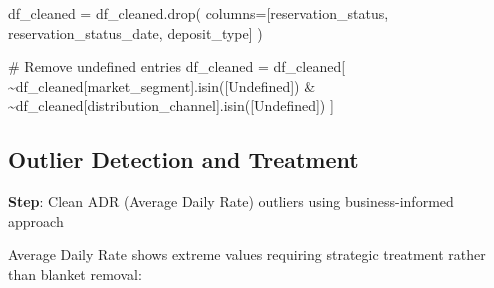 \documentclass[
  letterpaper,
  DIV=11,
  numbers=noendperiod]{scrartcl}
\newenvironment{Shaded}{\begin{snugshade}}{\end{snugshade}}
\newcommand{\CommentTok}[1]{\textcolor[rgb]{0.37,0.37,0.37}{#1}}
\newcommand{\NormalTok}[1]{\textcolor[rgb]{0.00,0.23,0.31}{#1}}
\newcommand{\OperatorTok}[1]{\textcolor[rgb]{0.37,0.37,0.37}{#1}}
\newcommand{\StringTok}[1]{\textcolor[rgb]{0.13,0.47,0.30}{#1}}
\renewenvironment{Shaded}{%
  \begin{tcolorbox}[%
    enhanced,%
    colback=codebg,%
    colframe=codebg,%
    borderline west={3pt}{0pt}{sectionblue},%
    fontupper=\small\ttfamily,%
    boxrule=0pt,%
    arc=0pt,%
    boxsep=5pt,%
    left=2mm,%
    right=2mm,%
    top=2mm,%
    bottom=2mm%
  ]%
}{%
  \end{tcolorbox}%
}
\begin{document}
\begin{Shaded}
\begin{Highlighting}[]
\NormalTok{df\_cleaned }\OperatorTok{=}\NormalTok{ df\_cleaned.drop(}
\NormalTok{    columns}\OperatorTok{=}\NormalTok{[}\StringTok{\textquotesingle{}reservation\_status\textquotesingle{}}\NormalTok{, }\StringTok{\textquotesingle{}reservation\_status\_date\textquotesingle{}}\NormalTok{, }\StringTok{\textquotesingle{}deposit\_type\textquotesingle{}}\NormalTok{]}
\NormalTok{)}

\CommentTok{\# Remove undefined entries}
\NormalTok{df\_cleaned }\OperatorTok{=}\NormalTok{ df\_cleaned[}
    \OperatorTok{\textasciitilde{}}\NormalTok{df\_cleaned[}\StringTok{\textquotesingle{}market\_segment\textquotesingle{}}\NormalTok{].isin([}\StringTok{\textquotesingle{}Undefined\textquotesingle{}}\NormalTok{]) }\OperatorTok{\&} 
    \OperatorTok{\textasciitilde{}}\NormalTok{df\_cleaned[}\StringTok{\textquotesingle{}distribution\_channel\textquotesingle{}}\NormalTok{].isin([}\StringTok{\textquotesingle{}Undefined\textquotesingle{}}\NormalTok{])}
\NormalTok{]}
\end{Highlighting}
\end{Shaded}

\subsection{Outlier Detection and
Treatment}\label{outlier-detection-and-treatment}

\textbf{Step}: Clean ADR (Average Daily Rate) outliers using
business-informed approach

Average Daily Rate shows extreme values requiring strategic treatment
rather than blanket removal:
\end{document}
